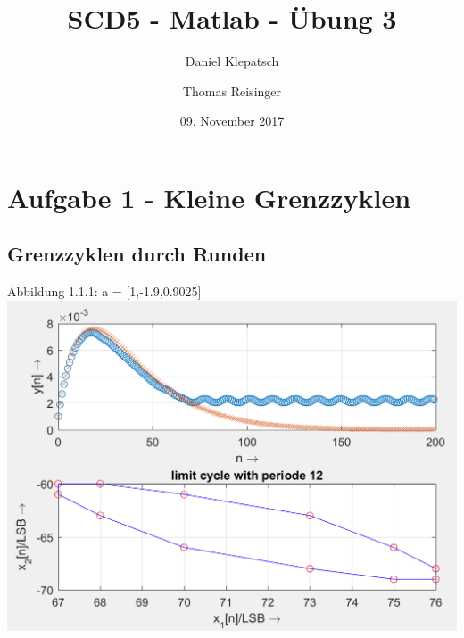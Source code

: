 


\title{SCD5 - Matlab - Übung 3}
\date{09. November 2017}
\author{Daniel Klepatsch \and Thomas Reisinger}
        
\maketitle

\newpage



\tableofcontents

\newpage

\section{Aufgabe 1 - Kleine Grenzzyklen}

\subsection{Grenzzyklen durch Runden}

\begin{center}
Abbildung 1.1.1: a = [1,-1.9,0.9025]\\
\includegraphics[scale=0.9]{../Tab1_1.PNG}
\end{center}

